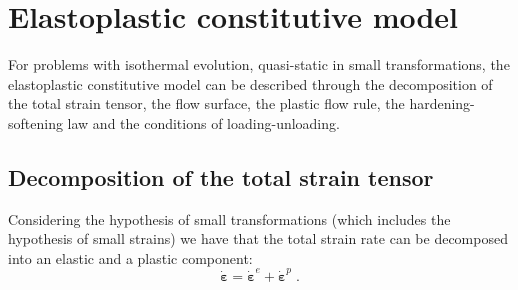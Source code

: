 \documentclass[Journal,letterpaper]{ascelike-new}
\newcommand{\dstraine}{\boldsymbol{\dot{\varepsilon}}^{e}}
\newcommand{\dstrainp}{\boldsymbol{\dot{\varepsilon}}^{p}}
\newcommand{\dstrain}{\boldsymbol{\dot{\varepsilon}}}
\begin{document}



\section{Elastoplastic constitutive model}

For problems with isothermal evolution, quasi-static in small transformations, the elastoplastic constitutive model can be described through the decomposition of the total strain tensor, the flow surface, the plastic flow rule, the hardening-softening law and the conditions of loading-unloading.

\subsection{Decomposition of the total strain tensor}

Considering the hypothesis of small transformations (which includes the hypothesis of small strains) we have that the total strain rate can be decomposed into an elastic and a plastic component:
\begin{equation} \label{eq_decomposition_plastic}
    \dstrain=\dstraine + \dstrainp\;.
\end{equation}
\end{document}
